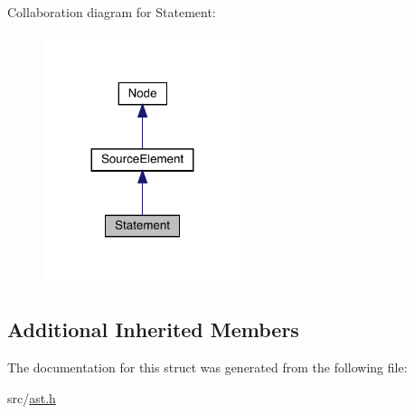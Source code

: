 Collaboration diagram for Statement\+:
\nopagebreak
\begin{figure}[H]
\begin{center}
\leavevmode
\includegraphics[width=164pt]{struct_statement__coll__graph}
\end{center}
\end{figure}
\subsection*{Additional Inherited Members}


The documentation for this struct was generated from the following file\+:\begin{DoxyCompactItemize}
\item 
src/\hyperlink{ast_8h}{ast.\+h}\end{DoxyCompactItemize}
